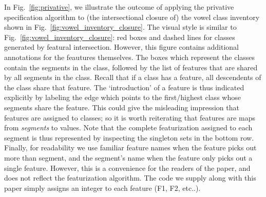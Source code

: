 \documentclass[11pt, oneside]{article}   	%
\begin{document}
\vspace{\baselineskip} In Fig.~\ref{fig:privative}, we illustrate the outcome of applying the privative specification algorithm to (the intersectional closure of) the vowel class inventory shown in Fig.~\ref{fig:vowel_inventory_closure}. The visual style is similar to Fig.~\ref{fig:vowel_inventory_closure}: red boxes and dashed lines for classes generated by featural intersection. However, this figure contains additional annotations for the feautures themselves. The boxes which represent the classes contain the segments in the class, followed by the list of features that are shared by all segments in the class. Recall that if a class has a feature, all descendents of the class share that feature. The `introduction' of a feature is thus indicated explicitly by labeling the edge which points to the first/highest class whose segments share the feature. This could give the misleading impression that features are assigned to classes; so it is worth reiterating that features are maps from \textit{segments} to values. Note that the complete featurization assigned to each segment is thus represented by inspecting the singleton sets in the bottom row. Finally, for readability we use familiar feature names when the feature picks out more than segment, and the segment's name when the feature only picks out a single feature. However, this is a convenience for the readers of the paper, and does not reflect the featurization algorithm. The code we supply along with this paper simply assigns an integer to each feature (F1, F2, etc..). 
\end{document}
